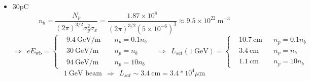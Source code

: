 \begin{itemize}
$$\begin{aligned}
&17 ~\text{GeV/m }&& n_p=0.1 n_b \\
&54 ~\text{GeV/m} && n_p=n_b\\
&172 ~\text{GeV/m} &&n_p=10 n_b
\end{aligned}\right.\quad\Rightarrow ~~L_{sat}(1 ~\text{GeV})=\left\{\begin{aligned}
&5.8 ~\text{cm}&& n_p=0.1 n_b \\
&1.9 ~\text{cm} && n_p=n_b\\
&0.6 ~\text{cm} &&n_p=10 n_b
\end{aligned}\right.$$
$$1 ~\text{GeV beam} ~~\Rightarrow ~~ L_{sat}\sim 2 ~\text{cm}=2*10^4 \mu \text{m} $$
\item  30pC $$n_b=\frac{N_p}{(2\pi)^{3/2} \sigma_y^2\sigma_x}=\frac{1.87\times 10^{8}}{(2\pi)^{3/2} (5\times 10^{-6})^3}\approx 9.5\times 10^{22}~ \text{m}^{-3} $$
$$\Rightarrow ~~eE_{\text{wb}}=\left\{\begin{aligned}
&9.4 ~\text{GeV/m }&& n_p=0.1 n_b \\
&30 ~\text{GeV/m} && n_p=n_b\\
&94 ~\text{GeV/m} &&n_p=10 n_b
\end{aligned}\right.\quad\Rightarrow ~~L_{sat}(1 ~\text{GeV})=\left\{\begin{aligned}
&10.7 ~\text{cm}&& n_p=0.1 n_b \\
&3.4 ~\text{cm} && n_p=n_b\\
&1.1 ~\text{cm} &&n_p=10 n_b
\end{aligned}\right.$$
$$1 ~\text{GeV beam} ~~\Rightarrow ~~ L_{sat}\sim 3.4 ~\text{cm}=3.4*10^4 \mu \text{m} $$


\end{itemize}